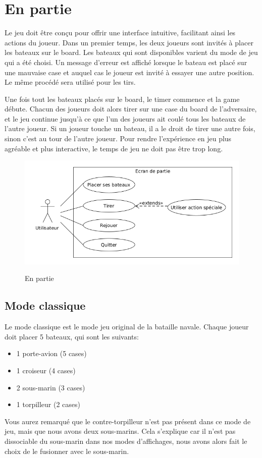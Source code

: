 \documentclass[../besoin_user.tex]{subfiles}
\begin{document}
\section{En partie}
Le jeu doit être conçu pour offrir une interface intuitive, facilitant ainsi les actions du joueur.
Dans un premier temps, les deux joueurs sont invités à placer les bateaux sur le board.
Les bateaux qui sont disponibles varient du mode de jeu qui a été choisi.
Un message d'erreur est affiché lorsque le bateau est placé sur une mauvaise case et auquel cas le joueur est invité à 
essayer une autre position. Le même procédé sera utilisé pour les tirs.

Une fois tout les bateaux placés sur le board, le timer commence et la game débute.
Chacun des joueurs doit alors tirer sur une case du board de l'adversaire, et le jeu continue jusqu'à ce que l'un des joueurs ait coulé tous les bateaux de l'autre joueur.
Si un joueur touche un bateau, il a le droit de tirer une autre fois, sinon c'est au tour de l'autre joueur.
Pour rendre l'expérience en jeu plus agréable et plus interactive, le temps de jeu ne doit pas être trop long.

\begin{figure}[h]
    \centering
    \includegraphics[scale=0.6]{img_fonctionnel/use_case_user_ecran_partie.png}
    \label{fig:user_partie}
    \caption{En partie}
\end{figure}

\subsection{Mode classique}
Le mode classique est le mode jeu original de la bataille navale. Chaque joueur doit placer 5 bateaux, qui sont les suivants:
\begin{itemize}
    \item 1 porte-avion (5 cases)
    \item 1 croiseur (4 cases)
    \item 2 sous-marin (3 cases)
    \item 1 torpilleur (2 cases)
\end{itemize}
Vous aurez remarqué que le contre-torpilleur n'est pas présent dans ce mode de jeu, mais que nous avons deux sous-marins. Cela s'explique car il n'est pas
dissociable du sous-marin dans nos modes d'affichages, nous avons alors fait le choix de le fusionner avec le sous-marin.
\end{document}
